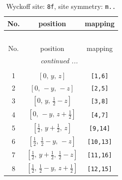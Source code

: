 \documentclass[fleqn,8pt]{jsarticle}
\begin{document}
\begin{longtable}{ccc}
\caption{Wyckoff site: {\tt 8f}, site symmetry: {\tt m..}}
 \\
 \hline \hline
No. & position & mapping \\ \hline \endfirsthead

\multicolumn{2}{l}{\tablename\ \thetable{}} \\
 \hline \hline
No. & position & mapping \\ \hline \endhead

 \hline \hline
\multicolumn{2}{r}{\footnotesize\it continued ...} \\ \endfoot

 \hline \hline
\multicolumn{2}{r}{} \\ \endlastfoot

1 & $\left[ 0,\, y,\, z \right]$ & {\tt [1,6]} \\ \hline
2 & $\left[ 0,\, - y,\, - z \right]$ & {\tt [2,5]} \\ \hline
3 & $\left[ 0,\, y,\, \frac{1}{2} - z \right]$ & {\tt [3,8]} \\ \hline
4 & $\left[ 0,\, - y,\, z + \frac{1}{2} \right]$ & {\tt [4,7]} \\ \hline
5 & $\left[ \frac{1}{2},\, y + \frac{1}{2},\, z \right]$ & {\tt [9,14]} \\ \hline
6 & $\left[ \frac{1}{2},\, \frac{1}{2} - y,\, - z \right]$ & {\tt [10,13]} \\ \hline
7 & $\left[ \frac{1}{2},\, y + \frac{1}{2},\, \frac{1}{2} - z \right]$ & {\tt [11,16]} \\ \hline
8 & $\left[ \frac{1}{2},\, \frac{1}{2} - y,\, z + \frac{1}{2} \right]$ & {\tt [12,15]} \\
\end{longtable}
\renewcommand{\arraystretch}{1.2}
\end{document}
